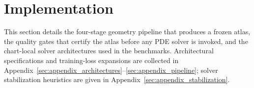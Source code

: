 \documentclass[sort&compress]{svjour3} %
\begin{document}




\section{Implementation}
\label{sec:implementation}

This section details the four-stage geometry pipeline that produces a frozen atlas, the quality gates that certify the atlas before any PDE solver is invoked, and the chart-local solver architectures used in the benchmarks. Architectural specifications and training-loss expansions are collected in Appendix~\ref{sec:appendix_architectures}--\ref{sec:appendix_pipeline}; solver stabilization heuristics are given in Appendix~\ref{sec:appendix_stabilization}.
\end{document}
